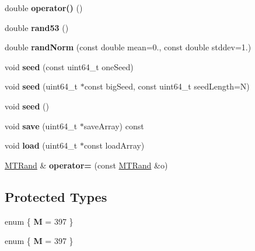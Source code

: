 \begin{DoxyCompactItemize}
\item 
\hypertarget{classMTRand_abbb87a08d622d58fdee0eea4cb5471a0}{double {\bfseries operator()} ()}\label{classMTRand_abbb87a08d622d58fdee0eea4cb5471a0}

\item 
\hypertarget{classMTRand_a15f4daf79febbe4ff43c3e6ce2c4fcbe}{double {\bfseries rand53} ()}\label{classMTRand_a15f4daf79febbe4ff43c3e6ce2c4fcbe}

\item 
\hypertarget{classMTRand_a4c284f626b6d40a0367ff2a949ea1944}{double {\bfseries rand\-Norm} (const double mean=0., const double stddev=1.)}\label{classMTRand_a4c284f626b6d40a0367ff2a949ea1944}

\item 
\hypertarget{classMTRand_aa14afdf05231b303915d3ede9083933c}{void {\bfseries seed} (const uint64\-\_\-t one\-Seed)}\label{classMTRand_aa14afdf05231b303915d3ede9083933c}

\item 
\hypertarget{classMTRand_a685897ab29cb57074ddb663f2aaf3571}{void {\bfseries seed} (uint64\-\_\-t $\ast$const big\-Seed, const uint64\-\_\-t seed\-Length=N)}\label{classMTRand_a685897ab29cb57074ddb663f2aaf3571}

\item 
\hypertarget{classMTRand_ad88ea3363d55bafb62826bbd130279c2}{void {\bfseries seed} ()}\label{classMTRand_ad88ea3363d55bafb62826bbd130279c2}

\item 
\hypertarget{classMTRand_ac3dc3ece794feff49ba83ed2fa7a4da2}{void {\bfseries save} (uint64\-\_\-t $\ast$save\-Array) const }\label{classMTRand_ac3dc3ece794feff49ba83ed2fa7a4da2}

\item 
\hypertarget{classMTRand_add6ab0d26a0edeedd46853accae4eb1a}{void {\bfseries load} (uint64\-\_\-t $\ast$const load\-Array)}\label{classMTRand_add6ab0d26a0edeedd46853accae4eb1a}

\item 
\hypertarget{classMTRand_afd49933987cf916b2d6f5fd4094e7204}{\hyperlink{classMTRand}{M\-T\-Rand} \& {\bfseries operator=} (const \hyperlink{classMTRand}{M\-T\-Rand} \&o)}\label{classMTRand_afd49933987cf916b2d6f5fd4094e7204}

\end{DoxyCompactItemize}
\subsection*{Protected Types}
\begin{DoxyCompactItemize}
\item 
enum \{ {\bfseries M} = 397
 \}
\item 
enum \{ {\bfseries M} = 397
 \}
\end{DoxyCompactItemize}
